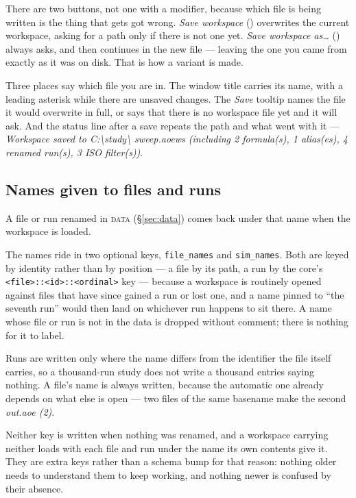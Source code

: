 \documentclass[11pt,a4paper,oneside]{report}
\newcommand{\code}[1]{\texttt{#1}}
\newcommand{\key}[1]{\textsf{\small\fbox{#1}}}
\newcommand{\tab}[1]{\textsc{#1}}
\begin{document}
There are two buttons, not one with a modifier, because which file is being
written is the thing that gets got wrong. \emph{Save workspace} (\key{Ctrl+S})
overwrites the current workspace, asking for a path only if there is not one yet.
\emph{Save workspace as\ldots} (\key{Ctrl+Shift+S}) always asks, and then
continues in the new file --- leaving the one you came from exactly as it was on
disk. That is how a variant is made.

Three places say which file you are in. The window title carries its name, with a
leading asterisk while there are unsaved changes. The \emph{Save} tooltip names
the file it would overwrite in full, or says that there is no workspace file yet
and it will ask. And the status line after a save repeats the path and what went
with it --- \emph{Workspace saved to C:\textbackslash study\textbackslash
sweep.aoews (including 2 formula(s), 1 alias(es), 4 renamed run(s), 3 ISO
filter(s))}.

\subsection{Names given to files and runs}

A file or run renamed in \tab{data} (\S\ref{sec:data}) comes back under that
name when the workspace is loaded.

The names ride in two optional keys, \code{file\_names} and \code{sim\_names}.
Both are keyed by identity rather than by position --- a file by its path, a run
by the core's \code{<file>::<id>::<ordinal>} key --- because a workspace is
routinely opened against files that have since gained a run or lost one, and a
name pinned to ``the seventh run'' would then land on whichever run happens to sit
there. A name whose file or run is not in the data is dropped without comment;
there is nothing for it to label.

Runs are written only where the name differs from the identifier the file itself
carries, so a thousand-run study does not write a thousand entries saying
nothing. A file's name is always written, because the automatic one already
depends on what else is open --- two files of the same basename make the second
\emph{out.aoe (2)}.

Neither key is written when nothing was renamed, and a workspace carrying
neither loads with each file and run under the name its own contents give it.
They are extra keys rather than a schema bump for that reason: nothing older
needs to understand them to keep working, and nothing newer is confused by
their absence.
\end{document}
